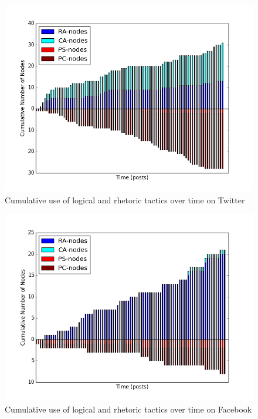 \begin{figure}
\centering
\includegraphics[scale=\scaleResults]{./figures/rhetoric_over_time/twitter.png}
\caption{Cumulative use of logical and rhetoric tactics over time on Twitter}
\label{figure:rhetorictime:Twitter}
\end{figure}

\begin{figure}
\centering
\includegraphics[scale=\scaleResults]{./figures/rhetoric_over_time/facebook.png}
\caption{Cumulative use of logical and rhetoric tactics over time on Facebook}
\label{figure:rhetorictime:Facebook}
\end{figure}

